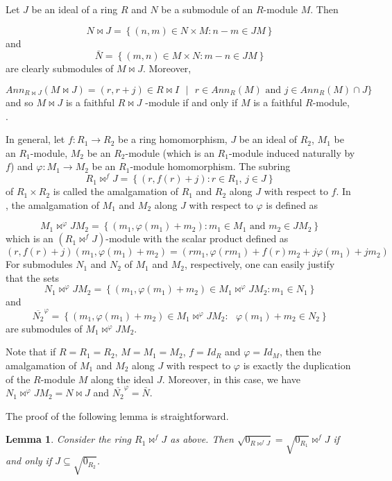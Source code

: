 \documentclass{amsart}%
\theoremstyle{plain}
\newtheorem{lemma}{Lemma}
\numberwithin{equation}{section}
\begin{document}
Let $J$ be an ideal of a ring $R$ and $N$ be a submodule of an $R$-module $M$. Then%

\[
N\Join J=\left\{  (n,m)\in N\times M:n-m\in JM\right\}
\]
and
\[
\bar{N}=\left\{  (m,n)\in M\times N:m-n\in JM\right\}
\]
are clearly submodules of $M\Join J$. Moreover,%

\[
Ann_{R\Join J}(M\Join J)=(r,r+j)\in R\Join I\text{ }|\text{ }r\in
Ann_{R}(M)\text{ and }j\in Ann_{R}(M)\cap J\}
\]
and so $M\Join J$ is a faithful $R\Join J$ -module if and only if $M$ is a
faithful $R$-module, \cite[Lemma 3.6]{Bouba}.

In general, let $f:R_{1}\rightarrow R_{2}$ be a ring homomorphism, $J$ be an
ideal of $R_{2}$, $M_{1}$ be an $R_{1}$-module, $M_{2}$ be an $R_{2}$-module
(which is an $R_{1}$-module induced naturally by $f$) and $\varphi
:M_{1}\rightarrow M_{2}$ be an $R_{1}$-module homomorphism. The subring
\[
R_{1}\Join^{f}J=\left\{  (r,f(r)+j):r\in R_{1}\text{, }j\in J\right\}
\]
of $R_{1}\times R_{2}$ is called the amalgamation of $R_{1}$ and $R_{2}$ along
$J$ with respect to $f$. In \cite{Rachida}, the amalgamation of $M_{1}$ and
$M_{2}$ along $J$ with respect to $\varphi$ is defined as%

\[
M_{1}\Join^{\varphi}JM_{2}=\left\{  (m_{1},\varphi(m_{1})+m_{2}):m_{1}\in
M_{1}\text{ and }m_{2}\in JM_{2}\right\}
\]
which is an $(R_{1}\Join^{f}J)$-module with the scalar product defined as
\[
(r,f(r)+j)(m_{1},\varphi(m_{1})+m_{2})=(rm_{1},\varphi(rm_{1})+f(r)m_{2}%
+j\varphi(m_{1})+jm_{2})
\]
For submodules $N_{1}$ and $N_{2}$ of $M_{1}$ and $M_{2}$, respectively, one
can easily justify that the sets
\[
N_{1}\Join^{\varphi}JM_{2}=\left\{  (m_{1},\varphi(m_{1})+m_{2})\in M_{1}%
\Join^{\varphi}JM_{2}:m_{1}\in N_{1}\right\}
\]
and
\[
\overline{N_{2}}^{\varphi}=\left\{  (m_{1},\varphi(m_{1})+m_{2})\in M_{1}%
\Join^{\varphi}JM_{2}:\text{ }\varphi(m_{1})+m_{2}\in N_{2}\right\}
\]
are submodules of $M_{1}\Join^{\varphi}JM_{2}$.

Note that if $R=R_{1}=R_{2}$, $M=M_{1}=M_{2}$, $f=Id_{R}$ and $\varphi=Id_{M}%
$, then the amalgamation of $M_{1}$ and $M_{2}$ along $J$ with respect to
$\varphi$ is exactly the duplication of the $R$-module $M$ along the ideal
$J$. Moreover, in this case, we have $N_{1}\Join^{\varphi}JM_{2}=N\Join J$ and
$\overline{N_{2}}^{\varphi}=\bar{N}$.

The proof of the following lemma is straightforward.

\begin{lemma}
\label{Lemma}Consider the ring $R_{1}\Join^{f}J$ as above. Then $\sqrt
{0_{R\Join^{f}J}}=\sqrt{0_{R_{1}}}\Join^{f}J$ if and only if $J\subseteq
\sqrt{0_{R_{2}}}$.
\end{lemma}
\end{document}
